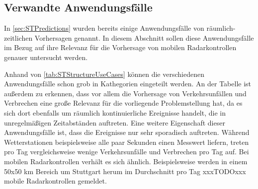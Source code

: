 \subsection{Verwandte Anwendungsfälle}
\label{sec:VerwandteAnwendungsfaelle}
In \autoref{sec:STPredictions} wurden bereits einige Anwendungsfälle von räumlich-zeitlichen Vorhersagen genannt.
In diesem Abschnitt sollen diese Anwendungsfälle im Bezug auf ihre Relevanz für die Vorhersage von mobilen Radarkontrollen genauer untersucht werden.

Anhand von \autoref{tab:STStructureUseCases} können die verschiedenen Anwendungsfälle schon grob in Kathegorien eingeteilt werden.
An der Tabelle ist außerdem zu erkennen, dass vor allem die Vorhersage von Verkehrsunfällen und Verbrechen eine große Relevanz für die vorliegende Problemstellung hat, da es sich dort ebenfalls um räumlich kontinuierliche Ereignisse handelt, die in unregelmäßigen Zeitabständen auftreten.
Eine weitere Eigenschaft dieser Anwendungsfälle ist, dass die Ereignisse nur sehr sporadisch auftreten.
Während Wetterstationen beispielsweise alle paar Sekunden einen Messwert liefern, treten pro Tag vergleichsweise wenige Verkehrsunfälle und Verbrechen pro Tag auf.
Bei mobilen Radarkontrollen verhält es sich ähnlich.
Beispielsweise werden in einem 50x50 km Bereich um Stuttgart herum im Durchschnitt pro Tag xxxTODOxxx mobile Radarkontrollen gemeldet.





